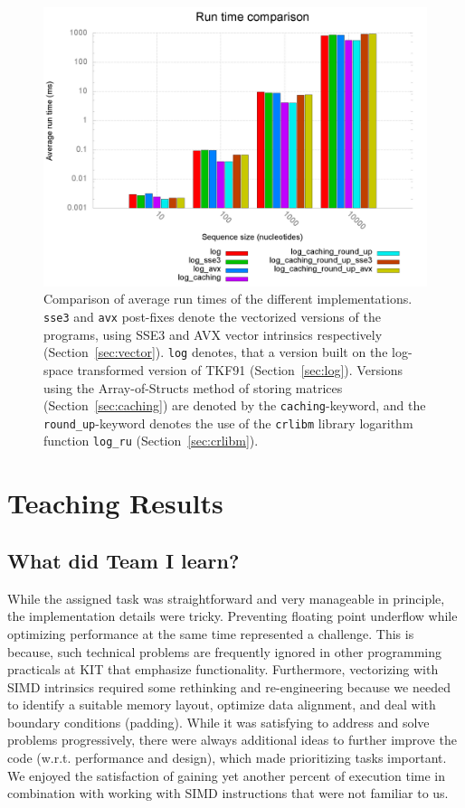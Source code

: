 \documentclass[runningheads,a4paper]{llncs}
\begin{document}
\begin{figure}[h!]
\includegraphics[width=\textwidth]{images/benchplot.png}
    \caption{Comparison of average run times of the different implementations. \texttt{sse3} and \texttt{avx} post-fixes denote the vectorized versions of the programs, using SSE3 and AVX vector intrinsics respectively (Section~\ref{sec:vector}). \texttt{log} denotes, that a version built on the log-space transformed version of TKF91 (Section~\ref{sec:log}). Versions using the Array-of-Structs method of storing matrices (Section~\ref{sec:caching}) are denoted by the \texttt{caching}-keyword, and the \texttt{round\_up}-keyword denotes the use of the \texttt{crlibm} library logarithm function \texttt{log\_ru} (Section~\ref{sec:crlibm}).}
\label{fig:runtime}
\end{figure}

\section{Teaching Results} 
\label{teaching-results} 
\subsection{What did Team I learn?}
While the assigned task was straightforward and very manageable in principle,
the implementation details were tricky.
Preventing floating point underflow while optimizing performance at the same time represented a challenge. 
This is because, such technical problems are frequently ignored in other programming practicals at KIT 
that emphasize functionality. 
Furthermore, vectorizing with SIMD intrinsics required some rethinking and re-engineering 
because we needed to identify a suitable memory layout, optimize data alignment, 
and deal with boundary conditions (padding). 
While it was satisfying to address and solve problems progressively, 
there were always additional ideas to further improve the code (w.r.t. performance and design), 
which made prioritizing tasks important.
We enjoyed the satisfaction of gaining yet another percent of execution time in combination 
with working with SIMD instructions that were not familiar to us.
\end{document}
